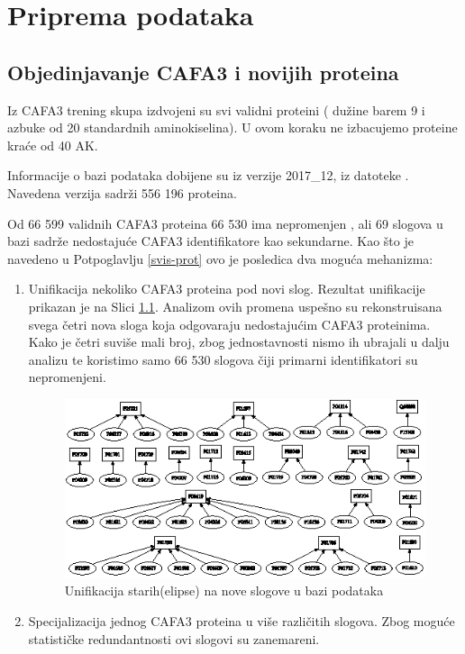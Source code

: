 
\chapter{Priprema podataka} %

\label{Priprema_podataka} %

\section{Objedinjavanje CAFA3 i novijih \swissprot proteina}
\label{objedinjavanje}

Iz CAFA3 trening skupa izdvojeni su svi validni proteini ( dužine barem 9 i
azbuke od 20 standardnih aminokiselina). U ovom koraku ne izbacujemo proteine
kraće od 40 AK.

Informacije o \swissprot bazi podataka dobijene su iz verzije 2017\_12, iz datoteke
 \cite{sprot}.
Navedena verzija sadrži 556 196 proteina. 

Od 66 599 validnih CAFA3 proteina 66 530 ima nepromenjen , ali 69 slogova u \swissprot bazi sadrže nedostajuće CAFA3
identifikatore kao sekundarne. Kao što je navedeno u Potpoglavlju
\ref{svis-prot} ovo je posledica dva moguća mehanizma:

\begin{enumerate}
  \item Unifikacija nekoliko CAFA3 proteina pod novi slog.
    Rezultat unifikacije prikazan je na Slici \ref{fig:unifikacija_slogova}. Analizom
    ovih promena uspešno su rekonstruisana svega četri nova \swissprot sloga
    koja odgovaraju nedostajućim CAFA3 proteinima. Kako je četri
    suviše mali broj, zbog jednostavnosti nismo ih ubrajali u dalju analizu
    te koristimo samo 66 530 slogova čiji primarni identifikatori su nepromenjeni.

  \begin{figure}[th]
  \centering
  \includegraphics[scale=2]{plots/unifikacija_slogova2.eps}
  \decoRule
  \caption{Unifikacija starih(elipse) na nove slogove u \swissprot bazi podataka}
  \label{fig:unifikacija_slogova}
  \end{figure}

  \item Specijalizacija jednog CAFA3 proteina u više različitih slogova.  Zbog moguće
    statističke redundantnosti ovi slogovi su zanemareni.
\end{enumerate}



